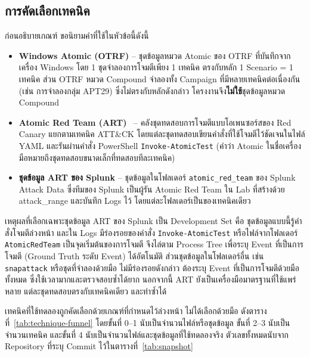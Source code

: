 \subsection{การคัดเลือกเทคนิค}
ก่อนอธิบายเกณฑ์ ขอนิยามคำที่ใช้ในหัวข้อนี้ดังนี้
\begin{itemize}
  \item \textbf{Windows Atomic (OTRF)} -- ชุดข้อมูลหมวด Atomic ของ OTRF ที่บันทึกจากเครื่อง Windows
        โดย 1 ชุดจำลองการโจมตีเพียง 1 เทคนิค ตรงกับหลัก 1 Scenario = 1 เทคนิค
        ส่วน OTRF หมวด Compound จำลองทั้ง Campaign ที่มีหลายเทคนิคต่อเนื่องกัน (เช่น การจำลองกลุ่ม APT29)
        ซึ่งไม่ตรงกับหลักดังกล่าว โครงงานจึง\textbf{ไม่ใช้}ชุดข้อมูลหมวด Compound
  \item \textbf{Atomic Red Team (ART)}~\cite{atomic-red-team} -- คลังชุดทดสอบการโจมตีแบบโอเพนซอร์สของ Red Canary
        แยกตามเทคนิค ATT\&CK โดยแต่ละชุดทดสอบเขียนคำสั่งที่ใช้โจมตีไว้ชัดเจนในไฟล์ YAML
        และรันผ่านคำสั่ง PowerShell \texttt{Invoke-AtomicTest}
        (คำว่า Atomic ในชื่อเครื่องมือหมายถึงชุดทดสอบขนาดเล็กที่ทดสอบทีละเทคนิค)
  \item \textbf{ชุดข้อมูล ART ของ Splunk} -- ชุดข้อมูลในโฟลเดอร์ \texttt{atomic\_red\_team} ของ Splunk Attack Data
        ซึ่งทีมของ Splunk เป็นผู้รัน Atomic Red Team ใน Lab ที่สร้างด้วย attack\_range และบันทึก Logs ไว้
        โดยแต่ละโฟลเดอร์เป็นของเทคนิคเดียว
\end{itemize}

เหตุผลที่เลือกเฉพาะชุดข้อมูล ART ของ Splunk เป็น Development Set คือ
ชุดข้อมูลแบบนี้รู้คำสั่งโจมตีล่วงหน้า และใน Logs มีร่องรอยของคำสั่ง \texttt{Invoke-AtomicTest}
หรือไฟล์จากโฟลเดอร์ \texttt{AtomicRedTeam} เป็นจุดเริ่มต้นของการโจมตี
จึงไล่ตาม Process Tree เพื่อระบุ Event ที่เป็นการโจมตี (Ground Truth ระดับ Event) ได้อัตโนมัติ
ส่วนชุดข้อมูลในโฟลเดอร์อื่น เช่น \texttt{snapattack} หรือชุดที่จำลองด้วยมือ ไม่มีร่องรอยดังกล่าว
ต้องระบุ Event ที่เป็นการโจมตีด้วยมือทั้งหมด ซึ่งใช้เวลามากและตรวจสอบซ้ำได้ยาก
นอกจากนี้ ART ยังเป็นเครื่องมือมาตรฐานที่ใช้แพร่หลาย แต่ละชุดทดสอบตรงกับเทคนิคเดียว และทำซ้ำได้

เทคนิคที่ใช้ทดลองถูกคัดเลือกด้วยเกณฑ์ที่กำหนดไว้ล่วงหน้า ไม่ได้เลือกด้วยมือ
ดังตารางที่~\ref{tab:technique-funnel} โดยขั้นที่ 0--1 นับเป็นจำนวนไฟล์หรือชุดข้อมูล
ขั้นที่ 2--3 นับเป็นจำนวนเทคนิค และขั้นที่ 4 นับเป็นจำนวนไฟล์และชุดข้อมูลที่ใช้ทดลองจริง
ตัวเลขทั้งหมดนับจาก Repository ที่ระบุ Commit ไว้ในตารางที่~\ref{tab:snapshot}

